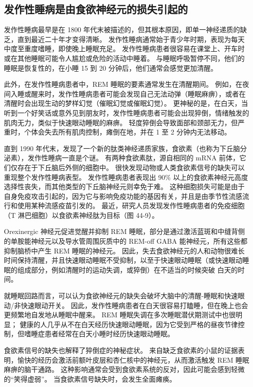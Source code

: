 \subsection{发作性睡病是由食欲神经元的损失引起的}
发作性睡病最早是在 1800 年代末被描述的，但其根本原因，即单一神经递质的缺乏，直到最近二十年才变得清晰。 发作性睡病通常始于青少年时期，表现为每天中度至重度嗜睡，即使晚上睡眠充足。 发作性睡病患者很容易在课堂上、开车时或在其他睡眠可能令人尴尬或危险的活动中睡着。 与睡眠呼吸暂停不同，他们的睡眠是恢复性的，在小睡 15 到 20 分钟后，他们通常会感觉更加清醒。

此外，在发作性睡病患者中，REM 睡眠的要素通常发生在清醒期间。 例如，在夜间入睡或醒来时，发作性睡病患者可能会发现自己无法动弹（睡眠麻痹），或者在清醒时会出现生动的梦样幻觉（催眠幻觉或催眠幻觉）。 更神秘的是，在白天，当听到一个好笑话或意外见到朋友时，发作性睡病患者可能会出现猝倒，情绪触发的肌肉无力，类似于快速眼动睡眠的麻痹。 轻度猝倒会导致面部和颈部无力，但严重时，个体会失去所有肌肉控制，瘫倒在地，并在 1 至 2 分钟内无法移动。

直到 1990 年代末，发现了一个新的肽类神经递质家族，食欲素（也称为下丘脑分泌素），发作性睡病一直是个谜。 有两种食欲素肽，源自相同的 mRNA 前体，它们仅存在于下丘脑后外侧的细胞中。 很快发现动物或人类食欲素信号的缺失可以重现整个发作性睡病表型。 发作性睡病患者表现出 90\% 以上的食欲素神经元高度选择性丧失，而其他类型的下丘脑神经元则幸免于难。 这种细胞损失可能是由于自身免疫攻击引起的，因为它与影响免疫功能的基因有关，并且是由季节性流感流行和使用某种流感疫苗引发的。 最近，研究人员发现发作性睡病患者的免疫细胞（T 淋巴细胞）以食欲素神经肽为目标（图 44-9）。

Orexinergic 神经元促进觉醒并抑制 REM 睡眠，部分是通过激活蓝斑和中缝背侧的单胺能神经元以及导水管周围灰质中的 REM-off GABA 能神经元，所有这些都抑制脑桥中产生 REM 睡眠的神经元。 因此，失去食欲神经元的人和动物很难长时间保持清醒，并且快速眼动睡眠不受抑制，以至于快速眼动睡眠（或快速眼动睡眠的组成部分，例如清醒时的运动失调，或猝倒）在不适当的时候突破 白天的时间。

就睡眠回路而言，可以认为食欲神经元的缺失会破坏大脑中的清醒-睡眠和快速眼动/非快速眼动开关。 因此，发作性睡病患者在白天很容易打瞌睡，但在晚上也会更频繁地自发地从睡眠中醒来。 REM 睡眠失调在多次睡眠潜伏期测试中也很明显； 健康的人几乎从不在白天经历快速眼动睡眠，因为它受到严格的昼夜节律控制，但嗜睡症患者经常在白天小睡时经历快速眼动睡眠。

食欲素信号的缺失也解释了猝倒症的神秘症状。 来自缺乏食欲素的小鼠的证据表明，愉快的经历会激活前额叶皮层和杏仁核中的神经元，从而激活触发 REM 睡眠麻痹的脑干通路。 这种影响通常会受到食欲素系统的反对，因此可能会感到轻微的“笑得虚弱”。 当食欲素信号缺失时，会发生全面瘫痪。

